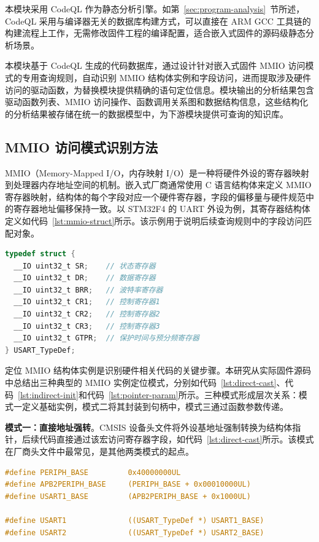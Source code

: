 本模块采用 CodeQL 作为静态分析引擎。如第~\ref{sec:program-analysis}~节所述，CodeQL 采用与编译器无关的数据库构建方式，可以直接在 ARM GCC 工具链的构建流程上工作，无需修改固件工程的编译配置，适合嵌入式固件的源码级静态分析场景。

本模块基于 CodeQL 生成的代码数据库，通过设计针对嵌入式固件 MMIO 访问模式的专用查询规则，自动识别 MMIO 结构体实例和字段访问，进而提取涉及硬件访问的驱动函数，为替换模块提供精确的语句定位信息。模块输出的分析结果包含驱动函数列表、MMIO 访问操作、函数调用关系图和数据结构信息，这些结构化的分析结果被存储在统一的数据模型中，为下游模块提供可查询的知识库。

\subsection{MMIO 访问模式识别方法}

MMIO（Memory-Mapped I/O，内存映射 I/O）是一种将硬件外设的寄存器映射到处理器内存地址空间的机制。嵌入式厂商通常使用 C 语言结构体来定义 MMIO 寄存器映射，结构体的每个字段对应一个硬件寄存器，字段的偏移量与硬件规范中的寄存器地址偏移保持一致。以 STM32F4 的 UART 外设为例，其寄存器结构体定义如代码~\ref{lst:mmio-struct}所示。该示例用于说明后续查询规则中的字段访问匹配对象。

\begin{lstlisting}[style=CStyle,language=C,caption={STM32F4 USART 寄存器结构体定义（stm32f401xe.h）},label=lst:mmio-struct]
typedef struct {
  __IO uint32_t SR;    // 状态寄存器
  __IO uint32_t DR;    // 数据寄存器
  __IO uint32_t BRR;   // 波特率寄存器
  __IO uint32_t CR1;   // 控制寄存器1
  __IO uint32_t CR2;   // 控制寄存器2
  __IO uint32_t CR3;   // 控制寄存器3
  __IO uint32_t GTPR;  // 保护时间与预分频寄存器
} USART_TypeDef;
\end{lstlisting}

定位 MMIO 结构体实例是识别硬件相关代码的关键步骤。本研究从实际固件源码中总结出三种典型的 MMIO 实例定位模式，分别如代码~\ref{lst:direct-cast}、代码~\ref{lst:indirect-init}和代码~\ref{lst:pointer-param}所示。三种模式形成层次关系：模式一定义基础实例，模式二将其封装到句柄中，模式三通过函数参数传递。

\textbf{模式一：直接地址强转}。CMSIS 设备头文件将外设基地址强制转换为结构体指针，后续代码直接通过该宏访问寄存器字段，如代码~\ref{lst:direct-cast}所示。该模式在厂商头文件中最常见，是其他两类模式的起点。

\begin{lstlisting}[style=CStyle,language=C,caption={直接地址强转模式（stm32f401xe.h）},label=lst:direct-cast]
#define PERIPH_BASE         0x40000000UL
#define APB2PERIPH_BASE     (PERIPH_BASE + 0x00010000UL)
#define USART1_BASE         (APB2PERIPH_BASE + 0x1000UL)

#define USART1              ((USART_TypeDef *) USART1_BASE)
#define USART2              ((USART_TypeDef *) USART2_BASE)
\end{lstlisting}

